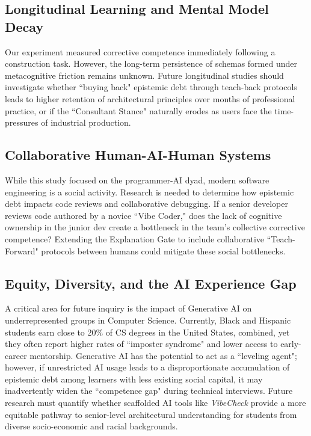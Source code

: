 \documentclass[sigconf]{acmart}
\begin{document}
\subsection{Longitudinal Learning and Mental Model Decay}
Our experiment measured corrective competence immediately following a construction task. However, the long-term persistence of schemas formed under metacognitive friction remains unknown. Future longitudinal studies should investigate whether ``buying back" epistemic debt through teach-back protocols leads to higher retention of architectural principles over months of professional practice, or if the ``Consultant Stance" naturally erodes as users face the time-pressures of industrial production.

\subsection{Collaborative Human-AI-Human Systems}
While this study focused on the programmer-AI dyad, modern software engineering is a social activity. Research is needed to determine how epistemic debt impacts code reviews and collaborative debugging. If a senior developer reviews code authored by a novice ``Vibe Coder," does the lack of cognitive ownership in the junior dev create a bottleneck in the team's collective corrective competence? Extending the Explanation Gate to include collaborative ``Teach-Forward" protocols between humans could mitigate these social bottlenecks.

\subsection{Equity, Diversity, and the AI Experience Gap}
A critical area for future inquiry is the impact of Generative AI on underrepresented groups in Computer Science. Currently, Black and Hispanic students earn close to 20\% of CS degrees in the United States, combined, \cite{siek2025taulbee,nces2023digest} yet they often report higher rates of ``imposter syndrome" and lower access to early-career mentorship. Generative AI has the potential to act as a ``leveling agent"; however, if unrestricted AI usage leads to a disproportionate accumulation of epistemic debt among learners with less existing social capital, it may inadvertently widen the ``competence gap" during technical interviews. Future research must quantify whether scaffolded AI tools like \textit{VibeCheck} provide a more equitable pathway to senior-level architectural understanding for students from diverse socio-economic and racial backgrounds.
\end{document}
